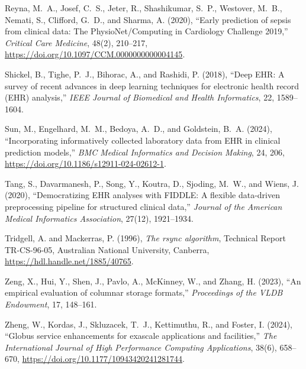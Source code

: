 \begin{thebibliography}{}
Reyna, M.~A., Josef, C.~S., Jeter, R., Shashikumar, S.~P., Westover, M.~B., Nemati, S., Clifford, G.~D., and Sharma, A. (2020), \enquote{Early prediction of sepsis from clinical data: The PhysioNet/Computing in Cardiology Challenge 2019,} \emph{Critical Care Medicine}, 48(2), 210--217, \url{https://doi.org/10.1097/CCM.0000000000004145}.

Shickel, B., Tighe, P.~J., Bihorac, A., and Rashidi, P. (2018), \enquote{Deep EHR: A survey of recent advances in deep learning techniques for electronic health record (EHR) analysis,} \emph{IEEE Journal of Biomedical and Health Informatics}, 22, 1589--1604.

Sun, M., Engelhard, M.~M., Bedoya, A.~D., and Goldstein, B.~A. (2024), \enquote{Incorporating informatively collected laboratory data from EHR in clinical prediction models,} \emph{BMC Medical Informatics and Decision Making}, 24, 206, \url{https://doi.org/10.1186/s12911-024-02612-1}.

Tang, S., Davarmanesh, P., Song, Y., Koutra, D., Sjoding, M.~W., and Wiens, J. (2020), \enquote{Democratizing EHR analyses with FIDDLE: A flexible data-driven preprocessing pipeline for structured clinical data,} \emph{Journal of the American Medical Informatics Association}, 27(12), 1921--1934.

Tridgell, A. and Mackerras, P. (1996), \emph{The rsync algorithm}, Technical Report TR-CS-96-05, Australian National University, Canberra, \url{https://hdl.handle.net/1885/40765}.

Zeng, X., Hui, Y., Shen, J., Pavlo, A., McKinney, W., and Zhang, H. (2023), \enquote{An empirical evaluation of columnar storage formats,} \emph{Proceedings of the VLDB Endowment}, 17, 148--161.

Zheng, W., Kordas, J., Skluzacek, T.~J., Kettimuthu, R., and Foster, I. (2024), \enquote{Globus service enhancements for exascale applications and facilities,} \emph{The International Journal of High Performance Computing Applications}, 38(6), 658--670, \url{https://doi.org/10.1177/10943420241281744}.

\end{thebibliography}
